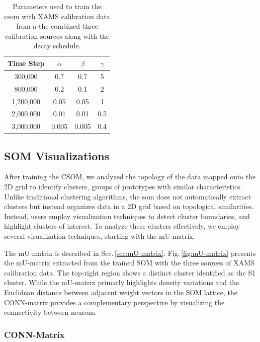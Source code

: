\begin{table}[]
    \centering
    \begin{tabular}{c|c|c|c}
         Time Step &  $\alpha$ &  $\beta$ &  $\gamma$\\ \hline
         300,000 &  0.7 &  0.7 &  5 \\
         800,000 & 0.2 & 0.1 & 2 \\
         1,200,000 & 0.05 & 0.05 & 1 \\
         2,000,000 & 0.01 & 0.01 & 0.5 \\
         3,000,000 & 0.005 & 0.005 & 0.4 \\

    \end{tabular}
    \caption{Parameters used to train the \acrshort{csom} with XAMS calibration data from a the combined three calibration sources along with the decay schedule.}
    \label{tab:som_parameters}
\end{table}


\subsection{SOM Visualizations}

After training the CSOM, we analyzed the topology of the data mapped onto the 2D grid to identify clusters, groups of prototypes with similar characteristics. Unlike traditional clustering algorithms, the \acrshort{som} does not automatically extract clusters but instead organizes data in a 2D grid based on topological similarities. Instead, users employ visualization techniques to detect cluster boundaries, and highlight clusters of interest. To analyze these clusters effectively, we employ several visualization techniques, starting with the mU-matrix.

The mU-matrix is described in Sec.\,\ref{sec:mU-matrix}. Fig.\,\ref{fig:mU-matrix} presents the mU-matrix extracted from the trained SOM with the three sources of XAMS calibration data. The top-right region shows a distinct cluster identified as the S1 cluster. While the mU-matrix primarly highlights density variations and the Euclidean distance between adjacent weight vectors in the SOM lattice, the CONN-matrix provides a complementary perspective by visualizing the connectivity between neurons.

\subsubsection{CONN-Matrix}
\label{sec:CONN_mat}

